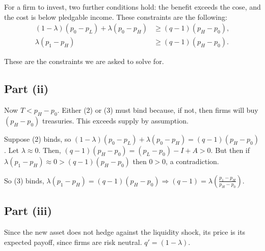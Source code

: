 \documentclass[11pt]{article} %
\begin{document}
For a firm to invest, two further conditions hold: the benefit exceeds the cose, and the cost is below pledgable income. These constraints are the following:
\begin{align*}
(1-\lambda)(p_0 - p_L) + \lambda(p_0 - p_H)&\geq (q-1)(p_H - p_0), \\
\lambda(p_1 - p_H)&\geq  (q-1)(p_H - p_0).
\end{align*}

These are the constraints we are asked to solve for.
\subsection{Part (ii)}

Now $T<p_H - p_0$. Either (2) or (3) must bind because, if not, then firms will buy $(p_H-p_0)$ treasuries. This exceeds supply by assumption.

Suppose (2) binds, so $(1-\lambda)(p_0 - p_L) + \lambda(p_0 - p_H)= (q-1)(p_H - p_0)$. Let $\lambda \approx 0$. Then, $(q-1)(p_H-p_0) = (p_L - p_0) - I + A>0$. But then if $\lambda(p_1 - p_H)\approx 0>  (q-1)(p_H - p_0)$ then $0>0$, a contradiction.

So (3) binds, $\lambda(p_1 - p_H) =  (q-1)(p_H - p_0) \Rightarrow (q-1) = \lambda \left(\frac{p_1 - p_H}{p_H - p_0}\right)$.

\subsection{Part (iii)}
Since the new asset does not hedge against the liquidity shock, its price is its expected payoff, since firms are risk neutral. $q' = (1-\lambda).$
\end{document}
